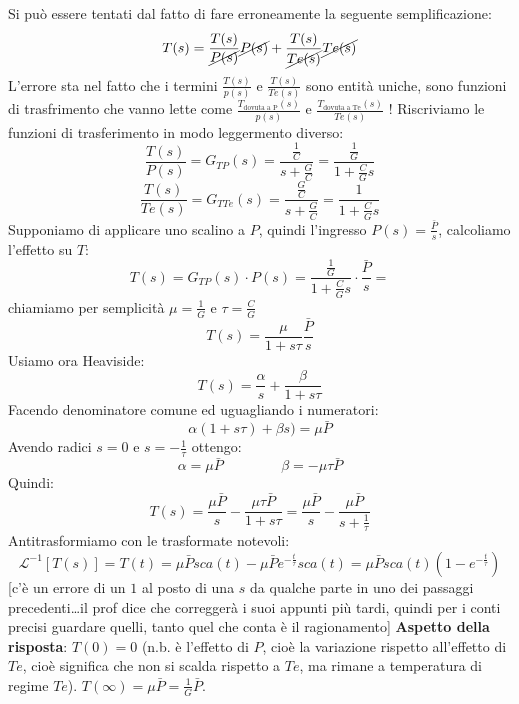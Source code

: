 Si può essere tentati dal fatto di fare erroneamente la seguente semplificazione:
\[
    T(s) = \frac{T(s)}{\cancel{P(s)}}\cancel{P(s)} + \frac{T(s)}{\cancel{Te(s)}}\cancel{Te(s)}
\]
L'errore sta nel fatto che i termini $\frac{T(s)}{p(s)}$ e $\frac{T(s)}{Te(s)}$ sono entità uniche, sono funzioni di trasfrimento che vanno lette come $\frac{T_{\text{dovuta a P}}(s)}{p(s)}$ e $\frac{T_{\text{dovuta a Te}}(s)}{Te(s)}$ !\newline
\newline
Riscriviamo le funzioni di trasferimento in modo leggermento diverso:
\[
    \frac{T(s)}{P(s)} = G_{TP}(s)= \frac{\frac{1}{C}}{s + \frac{G}{C}} = \frac{\frac{1}{G}}{1 + \frac{C}{G}s}
\]
\[
    \frac{T(s)}{Te(s)} = G_{TTe}(s) = \frac{\frac{G}{C}}{s+ \frac{G}{C}} = \frac{1}{1 + \frac{C}{G}s}
\]
Supponiamo di applicare uno scalino a $P$, quindi l'ingresso $P(s) = \frac{\bar{P}}{s}$, calcoliamo l'effetto su $T$:
\[
    T(s) = G_{TP}(s) \cdot P(s) = \frac{\frac{1}{G}}{1 + \frac{C}{G}s} \cdot  \frac{\bar{P}}{s} = 
\]
chiamiamo per semplicità $\mu = \frac{1}{G}$ e $\tau = \frac{C}{G}$ 
\[
    T(s) = \frac{\mu}{1 + s \tau} \frac{\bar{P}}{s}
\]
Usiamo ora Heaviside:
\[
    T(s) = \frac{\alpha}{s} + \frac{\beta}{1 + s \tau}
\]
Facendo denominatore comune ed uguagliando i numeratori:
\[
    \alpha(1 + s \tau) + \beta s ) = \mu \bar{P}
\]
Avendo radici $s= 0$ e $ s= - \frac{1}{\tau}$ ottengo:
\[
    \alpha = \mu \bar{P} \;\;\;\;\;\;\;\;\;\;\;\;\;\;\;\beta=-\mu \tau \bar{P}
\]
Quindi:
\[
    T(s) = \frac{\mu \bar{P}}{s} - \frac{\mu \tau \bar{P}}{1 + s \tau} = \frac{\mu \bar{P}}{s} - \frac{\mu \bar{P}}{s + \frac{1}{\tau}}
\]
Antitrasformiamo con le trasformate notevoli:
\[
    \mathcal{L}^{-1}[T(s)] = T(t) = \mu \bar{P} sca(t) - \mu \bar{P} e^{-\frac{t}{\tau}} sca(t) = \mu \bar{P} sca(t) (1- e^{- \frac{t}{\tau}})
\]
[c'è un errore di un $1$ al posto di una $s$ da qualche parte in uno dei passaggi precedenti\dots il prof dice che correggerà i suoi appunti più tardi, quindi per i conti precisi guardare quelli, tanto quel che conta è il ragionamento]\newline
\newline
\textbf{Aspetto della risposta}:\newline
\newline
$T(0) = 0$ (n.b. è l'effetto di $P$, cioè la variazione rispetto all'effetto di $Te$, cioè significa che non si scalda rispetto a $Te$, ma rimane a temperatura di regime $Te$).\newline
\newline
$T(\infty) = \mu \bar{P} = \frac{1}{G}\bar{P}$.\newline
